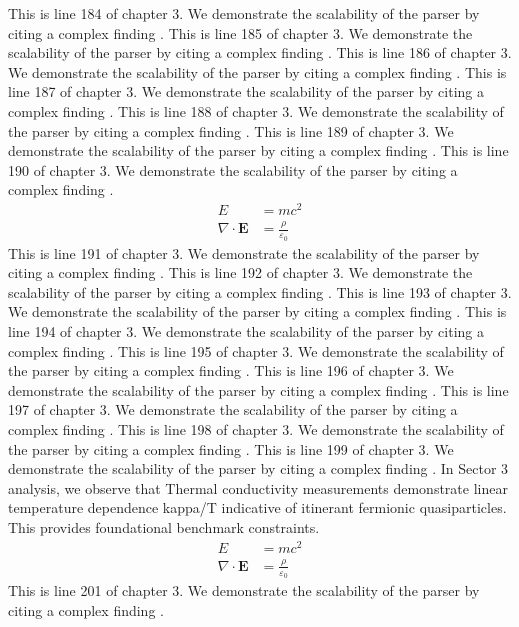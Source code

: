 This is line 184 of chapter 3. We demonstrate the scalability of the parser by citing a complex finding \cite{ref3_184}.
This is line 185 of chapter 3. We demonstrate the scalability of the parser by citing a complex finding \cite{ref3_185}.
This is line 186 of chapter 3. We demonstrate the scalability of the parser by citing a complex finding \cite{ref3_186}.
This is line 187 of chapter 3. We demonstrate the scalability of the parser by citing a complex finding \cite{ref3_187}.
This is line 188 of chapter 3. We demonstrate the scalability of the parser by citing a complex finding \cite{ref3_188}.
This is line 189 of chapter 3. We demonstrate the scalability of the parser by citing a complex finding \cite{ref3_189}.
This is line 190 of chapter 3. We demonstrate the scalability of the parser by citing a complex finding \cite{ref3_190}.
\begin{align*}
  E &= mc^2 \\
  \nabla \cdot \mathbf{E} &= \frac{\rho}{\varepsilon_0}
\end{align*}
This is line 191 of chapter 3. We demonstrate the scalability of the parser by citing a complex finding \cite{ref3_191}.
This is line 192 of chapter 3. We demonstrate the scalability of the parser by citing a complex finding \cite{ref3_192}.
This is line 193 of chapter 3. We demonstrate the scalability of the parser by citing a complex finding \cite{ref3_193}.
This is line 194 of chapter 3. We demonstrate the scalability of the parser by citing a complex finding \cite{ref3_194}.
This is line 195 of chapter 3. We demonstrate the scalability of the parser by citing a complex finding \cite{ref3_195}.
This is line 196 of chapter 3. We demonstrate the scalability of the parser by citing a complex finding \cite{ref3_196}.
This is line 197 of chapter 3. We demonstrate the scalability of the parser by citing a complex finding \cite{ref3_197}.
This is line 198 of chapter 3. We demonstrate the scalability of the parser by citing a complex finding \cite{ref3_198}.
This is line 199 of chapter 3. We demonstrate the scalability of the parser by citing a complex finding \cite{ref3_199}.
In Sector 3 analysis, we observe that Thermal conductivity measurements demonstrate linear temperature dependence kappa/T indicative of itinerant fermionic quasiparticles. This provides foundational benchmark constraints.
\begin{align*}
  E &= mc^2 \\
  \nabla \cdot \mathbf{E} &= \frac{\rho}{\varepsilon_0}
\end{align*}
This is line 201 of chapter 3. We demonstrate the scalability of the parser by citing a complex finding \cite{ref3_201}.
